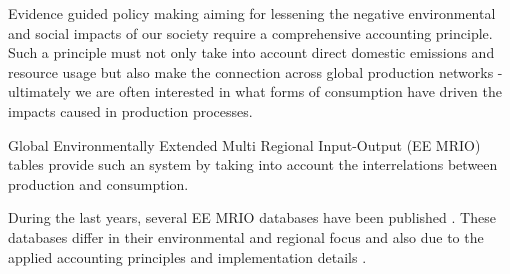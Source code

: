Evidence guided policy making aiming for lessening the negative environmental and social impacts of our society require a comprehensive accounting principle. Such a principle must not only take into account direct domestic emissions and resource usage but also make the connection across global production networks - ultimately we are often interested in what forms of consumption have driven the impacts caused in production processes.

Global Environmentally Extended Multi Regional Input-Output (EE MRIO) tables provide such an system by taking into account the interrelations between production and consumption. 

During the last years, several EE MRIO databases have been published \cite{Tukker_2013}. These databases differ in their environmental and regional focus and also due to the applied accounting principles and implementation details \cite{Stadler_2014, Owen_2014, Moran_2014}. 
